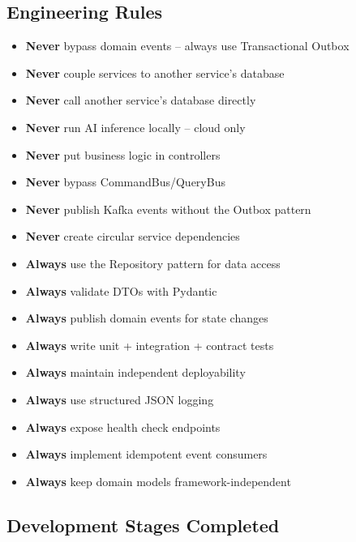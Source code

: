 \documentclass[11pt,a4paper]{article}
\begin{document}
\subsection{Engineering Rules}

\begin{itemize}
  \item \textbf{Never} bypass domain events -- always use Transactional Outbox
  \item \textbf{Never} couple services to another service's database
  \item \textbf{Never} call another service's database directly
  \item \textbf{Never} run AI inference locally -- cloud only
  \item \textbf{Never} put business logic in controllers
  \item \textbf{Never} bypass CommandBus/QueryBus
  \item \textbf{Never} publish Kafka events without the Outbox pattern
  \item \textbf{Never} create circular service dependencies
  \item \textbf{Always} use the Repository pattern for data access
  \item \textbf{Always} validate DTOs with Pydantic
  \item \textbf{Always} publish domain events for state changes
  \item \textbf{Always} write unit + integration + contract tests
  \item \textbf{Always} maintain independent deployability
  \item \textbf{Always} use structured JSON logging
  \item \textbf{Always} expose health check endpoints
  \item \textbf{Always} implement idempotent event consumers
  \item \textbf{Always} keep domain models framework-independent
\end{itemize}

\subsection{Development Stages Completed}
\end{document}
